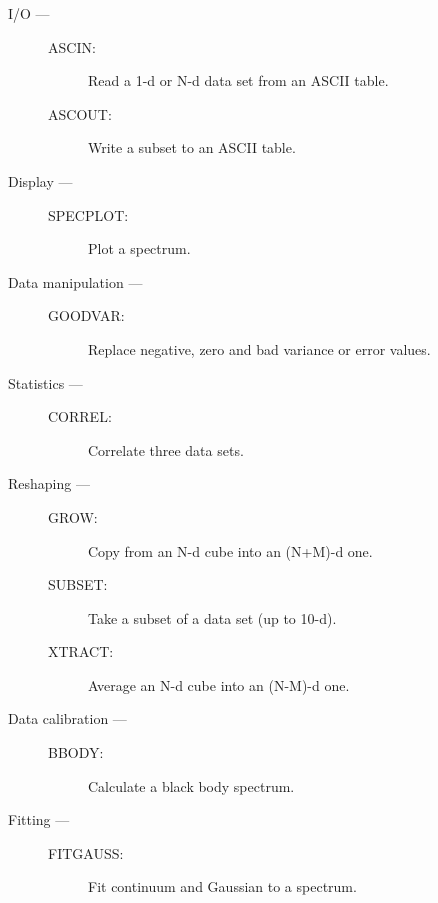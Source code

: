 \begin{description}

\item [I/O ---]
\begin{description}
\item [ASCIN:]  Read a 1-d or N-d data set from an ASCII table.
\item [ASCOUT:]  Write a subset to an ASCII table.
\end{description}

\item [Display ---]
\begin{description}
\item [SPECPLOT:]  Plot a spectrum.
\end{description}

\item [Data manipulation ---]
\begin{description}
\item [GOODVAR:]  Replace negative, zero and bad variance or error values.
\end{description}

\item [Statistics ---]
\begin{description}
\item [CORREL:]  Correlate three data sets.
\end{description}

\item [Reshaping ---]
\begin{description}
\item [GROW:]  Copy from an N-d cube into an (N+M)-d one.
\item [SUBSET:]  Take a subset of a data set (up to 10-d).
\item [XTRACT:]  Average an N-d cube into an (N-M)-d one.
\end{description}

\item [Data calibration ---]
\begin{description}
\item [BBODY:]  Calculate a black body spectrum.
\end{description}

\item [Fitting ---]
\begin{description}
\item [FITGAUSS:]  Fit continuum and Gaussian to a spectrum.
\end{description}
\end{description}

